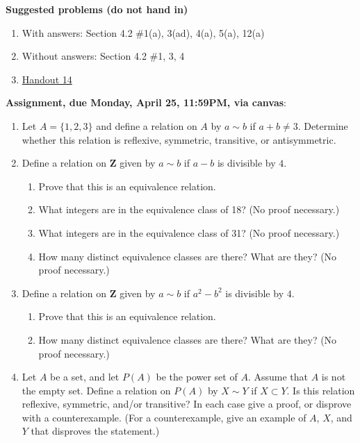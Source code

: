 \documentclass[12pt]{article}
\begin{document}
\noindent \textbf{Suggested problems (do not hand in)}

\begin{enumerate}
\item With answers: Section 4.2 \#1(a), 3(ad), 4(a), 5(a), 12(a)
\item Without answers: Section 4.2 \#1, 3, 4
\item \href{https://www.math.emory.edu/~dzb/teaching/250Fall2021/handouts/250-H14-equivalence-relations.pdf}{Handout 14}
\end{enumerate}


\noindent \textbf{Assignment, due Monday, April 25, 11:59PM, via canvas}:
\begin{enumerate}
\item Let $A = \{1,2,3\}$ and define a relation on $A$ by $a \sim b$ if $a + b \neq 3$. Determine whether this relation is reflexive, symmetric, transitive, or antisymmetric.
\item Define a relation on $\mathbf{Z}$ given by $a \sim b$ if $a-b$ is divisible by $4$.
 \begin{enumerate}
 \item Prove that this is an equivalence relation.
 \item What integers are in the equivalence class of 18? (No proof necessary.)
 \item What integers are in the equivalence class of 31? (No proof necessary.) 
 \item How many distinct equivalence classes are there? What are they? (No proof necessary.)
 \end{enumerate}
\item Define a relation on $\mathbf{Z}$ given by $a \sim b$ if $a^2-b^2$ is divisible by $4$.
 \begin{enumerate}
 \item Prove that this is an equivalence relation.
 \item How many distinct equivalence classes are there? What are they? (No proof necessary.)
 \end{enumerate} 
\item Let $A$ be a set, and let $P(A)$ be the power set of $A$. Assume that $A$ is not the empty set. Define a relation on $P(A)$ by $X \sim Y$ if $X \subset Y$. Is this relation reflexive, symmetric, and/or transitive? In each case give a proof, or disprove with a counterexample. (For a counterexample, give an example of $A$, $X$, and $Y$ that disproves the statement.)
\end{enumerate}
\end{document}

